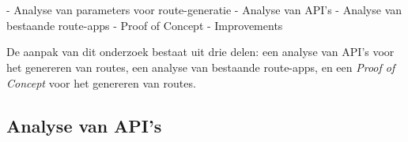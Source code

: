 
\chapter{}%
\label{ch:methodologie}


- Analyse van parameters voor route-generatie
- Analyse van API's
- Analyse van bestaande route-apps
- Proof of Concept
- Improvements

De aanpak van dit onderzoek bestaat uit drie delen: een analyse van API's voor het genereren van routes, een analyse van bestaande route-apps, en een \emph{Proof of Concept} voor het genereren van routes.

\section{Analyse van API's}

